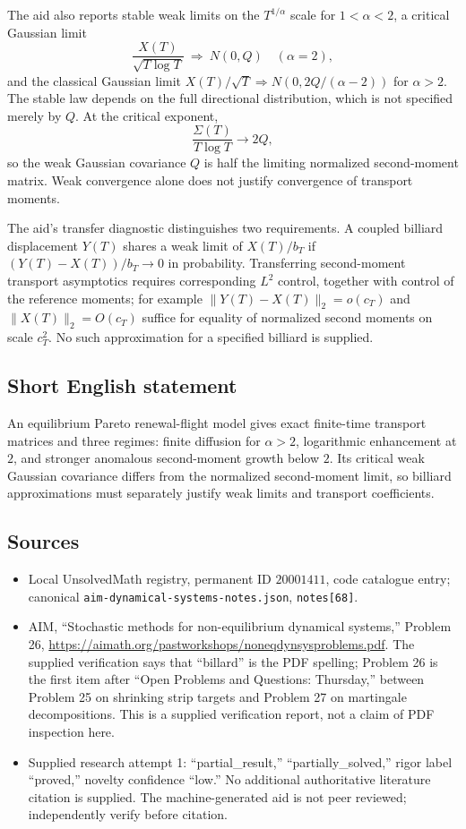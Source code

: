 \documentclass[11pt]{article}
\begin{document}
The aid also reports stable weak limits on the \(T^{1/\alpha}\) scale for \(1<\alpha<2\), a critical Gaussian limit
\[
 \frac{X(T)}{\sqrt{T\log T}}\ \Longrightarrow\ N(0,Q)\quad(\alpha=2),
\]
and the classical Gaussian limit \(X(T)/\sqrt T\Longrightarrow N(0,2Q/(\alpha-2))\) for \(\alpha>2\). The stable law depends on the full directional distribution, which is not specified merely by \(Q\). At the critical exponent,
\[
 \frac{\Sigma(T)}{T\log T}\longrightarrow2Q,
\]
so the weak Gaussian covariance \(Q\) is half the limiting normalized second-moment matrix. Weak convergence alone does not justify convergence of transport moments.

The aid's transfer diagnostic distinguishes two requirements. A coupled billiard displacement \(Y(T)\) shares a weak limit of \(X(T)/b_T\) if \((Y(T)-X(T))/b_T\to0\) in probability. Transferring second-moment transport asymptotics requires corresponding \(L^2\) control, together with control of the reference moments; for example \(\|Y(T)-X(T)\|_2=o(c_T)\) and \(\|X(T)\|_2=O(c_T)\) suffice for equality of normalized second moments on scale \(c_T^2\). No such approximation for a specified billiard is supplied.
\subsection{Short English statement}
An equilibrium Pareto renewal-flight model gives exact finite-time transport matrices and three regimes: finite diffusion for \(\alpha>2\), logarithmic enhancement at \(2\), and stronger anomalous second-moment growth below \(2\). Its critical weak Gaussian covariance differs from the normalized second-moment limit, so billiard approximations must separately justify weak limits and transport coefficients.
\subsection{Sources}
\begin{itemize}
\item Local UnsolvedMath registry, permanent ID \(20001411\), code catalogue entry; canonical \texttt{aim-dynamical-systems-notes.json}, \texttt{notes[68]}.
\item AIM, ``Stochastic methods for non-equilibrium dynamical systems,'' Problem 26, \url{https://aimath.org/pastworkshops/noneqdynsysproblems.pdf}. The supplied verification says that ``billard'' is the PDF spelling; Problem 26 is the first item after ``Open Problems and Questions: Thursday,'' between Problem 25 on shrinking strip targets and Problem 27 on martingale decompositions. This is a supplied verification report, not a claim of PDF inspection here.
\item Supplied research attempt 1: ``partial\_result,'' ``partially\_solved,'' rigor label ``proved,'' novelty confidence ``low.'' No additional authoritative literature citation is supplied. The machine-generated aid is not peer reviewed; independently verify before citation.
\end{itemize}
\end{document}
